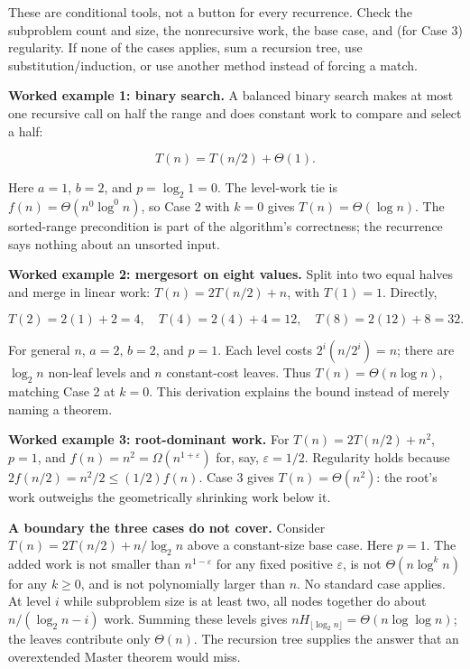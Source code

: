 These are conditional tools, not a button for every recurrence. Check the subproblem count and size, the nonrecursive work, the base case, and (for Case 3) regularity. If none of the cases applies, sum a recursion tree, use substitution/induction, or use another method instead of forcing a match.

\textbf{Worked example 1: binary search.} A balanced binary search makes at most one recursive call on half the range and does constant work to compare and select a half:

\[
T(n)=T(n/2)+\Theta(1).
\]

Here \(a=1\), \(b=2\), and \(p=\log_2 1=0\). The level-work tie is \(f(n)=\Theta(n^0\log^0 n)\), so Case 2 with \(k=0\) gives \(T(n)=\Theta(\log n)\). The sorted-range precondition is part of the algorithm's correctness; the recurrence says nothing about an unsorted input.

\textbf{Worked example 2: mergesort on eight values.} Split into two equal halves and merge in linear work: \(T(n)=2T(n/2)+n\), with \(T(1)=1\). Directly,

\[
T(2)=2(1)+2=4,\quad T(4)=2(4)+4=12,\quad T(8)=2(12)+8=32.
\]

For general \(n\), \(a=2\), \(b=2\), and \(p=1\). Each level costs \(2^i(n/2^i)=n\); there are \(\log_2 n\) non-leaf levels and \(n\) constant-cost leaves. Thus \(T(n)=\Theta(n\log n)\), matching Case 2 at \(k=0\). This derivation explains the bound instead of merely naming a theorem.

\textbf{Worked example 3: root-dominant work.} For \(T(n)=2T(n/2)+n^2\), \(p=1\), and \(f(n)=n^2=\Omega(n^{1+\varepsilon})\) for, say, \(\varepsilon=1/2\). Regularity holds because \(2f(n/2)=n^2/2\leq(1/2)f(n)\). Case 3 gives \(T(n)=\Theta(n^2)\): the root's work outweighs the geometrically shrinking work below it.

\textbf{A boundary the three cases do not cover.} Consider \(T(n)=2T(n/2)+n/\log_2 n\) above a constant-size base case. Here \(p=1\). The added work is not smaller than \(n^{1-\varepsilon}\) for any fixed positive \(\varepsilon\), is not \(\Theta(n\log^k n)\) for any \(k\geq0\), and is not polynomially larger than \(n\). No standard case applies. At level \(i\) while subproblem size is at least two, all nodes together do about \(n/(\log_2 n-i)\) work. Summing these levels gives \(n H_{\lfloor\log_2 n\rfloor}=\Theta(n\log\log n)\); the leaves contribute only \(\Theta(n)\). The recursion tree supplies the answer that an overextended Master theorem would miss.

